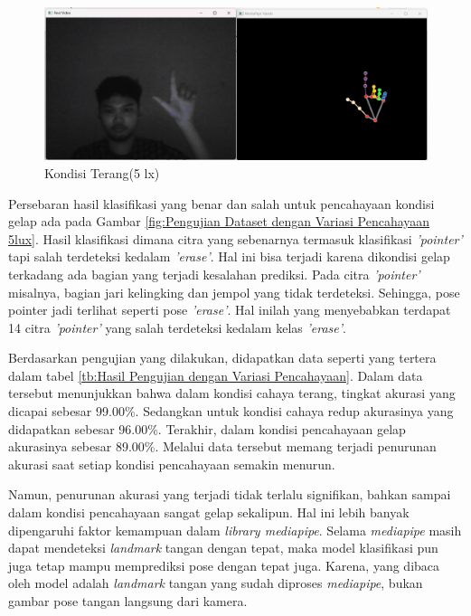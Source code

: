 \hfill \break

\begin{figure}[!htb]
  \centering
  \includegraphics[scale=0.4]{gambar/pengujian-cahaya/kondisi_5lux.png}
  \caption{Kondisi Terang(5 lx)}
  \label{fig:kondisi_5lux} 
\end{figure}

Persebaran hasil klasifikasi yang benar dan salah untuk pencahayaan kondisi gelap ada pada Gambar \ref{fig:Pengujian Dataset dengan Variasi Pencahayaan 5lux}. Hasil klasifikasi dimana citra yang sebenarnya termasuk klasifikasi \emph{'pointer'} tapi salah terdeteksi kedalam \emph{'erase'}. Hal ini bisa terjadi karena dikondisi gelap terkadang ada bagian yang terjadi kesalahan prediksi. Pada citra \emph{'pointer'} misalnya, bagian jari kelingking dan jempol yang tidak terdeteksi. Sehingga, pose pointer jadi terlihat seperti pose \emph{'erase'}. Hal inilah yang menyebabkan terdapat 14 citra \emph{'pointer'} yang salah terdeteksi kedalam kelas \emph{'erase'}. 

Berdasarkan pengujian yang dilakukan, didapatkan data seperti yang tertera dalam tabel \ref{tb:Hasil Pengujian dengan Variasi Pencahayaan}. Dalam data tersebut menunjukkan bahwa dalam kondisi cahaya terang, tingkat akurasi yang dicapai sebesar 99.00\%. Sedangkan untuk kondisi cahaya redup akurasinya yang didapatkan sebesar 96.00\%. Terakhir, dalam kondisi pencahayaan gelap akurasinya sebesar 89.00\%. Melalui data tersebut memang terjadi penurunan akurasi saat setiap kondisi pencahayaan semakin menurun. 

Namun, penurunan akurasi yang terjadi tidak terlalu signifikan, bahkan sampai dalam kondisi pencahayaan sangat gelap sekalipun. Hal ini lebih banyak dipengaruhi faktor kemampuan dalam \emph{library mediapipe}. Selama \emph{mediapipe} masih dapat mendeteksi \emph{landmark} tangan dengan tepat, maka model klasifikasi pun juga tetap mampu memprediksi pose dengan tepat juga. Karena, yang dibaca oleh model adalah \emph{landmark} tangan yang sudah diproses \emph{mediapipe}, bukan gambar pose tangan langsung dari kamera. 

